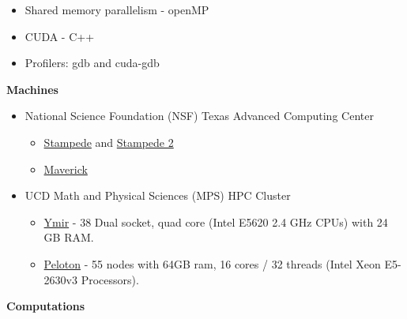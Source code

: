\documentclass[11pt]{ltxdoc}
\begin{document}
\begin{description}
\begin{description}
\begin{itemize}
          \item Shared memory parallelism - openMP
      
          \item CUDA - C++
      
          \item Profilers: gdb and cuda-gdb
      
      \end{itemize}
      
    \item[] \textbf{Machines}
    
      \vskip 06pt 
      
      \begin{itemize}
        
        \item National Science Foundation (NSF) Texas Advanced Computing Center
      
      \begin{itemize}
      	
        \item \href{https://portal.xsede.org/tacc-stampede}{Stampede} and \href{https://portal.xsede.org/tacc-stampede2}{Stampede 2}
        
        \item \href{https://portal.xsede.org/tacc-maverick}{Maverick} 
        
      \end{itemize}
  
      \item UCD Math and Physical Sciences (MPS) HPC Cluster
      
        \begin{itemize}
      	
          \item \href{https://wiki.cse.ucdavis.edu/support/systems/ymir}{Ymir} - 38 Dual socket, quad core (Intel E5620 2.4 GHz CPUs) with 24 GB RAM.
        
          \item \href{https://wiki.cse.ucdavis.edu/support/systems/peloton}{Peloton} - 55 nodes with 64GB ram, 16 cores / 32 threads (Intel Xeon E5-2630v3 Processors).
        
        \end{itemize}
  
      \end{itemize}  

    \item[] \textbf{Computations}
    

\end{description}
\end{description}
\end{document}
